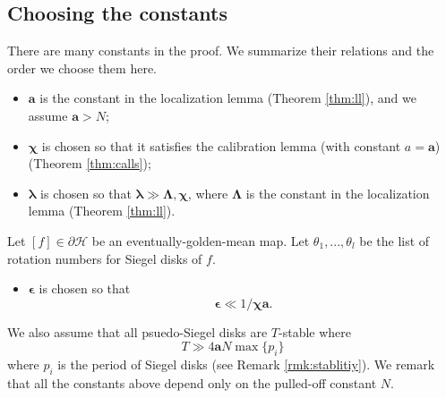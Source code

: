 \documentclass[11pt, reqno]{amsart}
\numberwithin{equation}{section}
\theoremstyle{plain}
\theoremstyle{theorem}
\theoremstyle{plain}
\theoremstyle{definition}
\numberwithin{figure}{section}
\begin{document}
\subsection{Choosing the constants}\label{subsec:constants}
There are many constants in the proof.
We summarize their relations and the order we choose them here.
\begin{itemize}
\item $\mathbf{a}$ is the constant in the localization lemma (Theorem \ref{thm:ll}), and we assume $\mathbf{a} > N$;
\item $\boldsymbol{\chi}$ is chosen so that it satisfies the calibration lemma (with constant $a = \mathbf{a}$)(Theorem \ref{thm:calls});
\item $\boldsymbol{\lambda}$ is chosen so that $\boldsymbol{\lambda} \gg \boldsymbol{\Lambda}, \boldsymbol{\chi}$, where $ \boldsymbol{\Lambda}$ is the constant in the localization lemma (Theorem \ref{thm:ll}).
\end{itemize}

Let $[f] \in \partial \mathcal{H}$ be an eventually-golden-mean map.
Let $\theta_1,..., \theta_l$ be the list of rotation numbers for Siegel disks of $f$.
\begin{itemize}
\item $\boldsymbol{\epsilon}$ is chosen so that 
$$
\boldsymbol{\epsilon} \ll 1/\boldsymbol{\chi}\mathbf{a}.
$$
\end{itemize}
We also assume that all psuedo-Siegel disks are $T$-stable where 
$$
T \gg 4\mathbf{a}N \max\{p_i\}
$$ 
where $p_i$ is the period of Siegel disks (see Remark \ref{rmk:stablitiy}).
We remark that all the constants above depend only on the pulled-off constant $N$.
\end{document}
